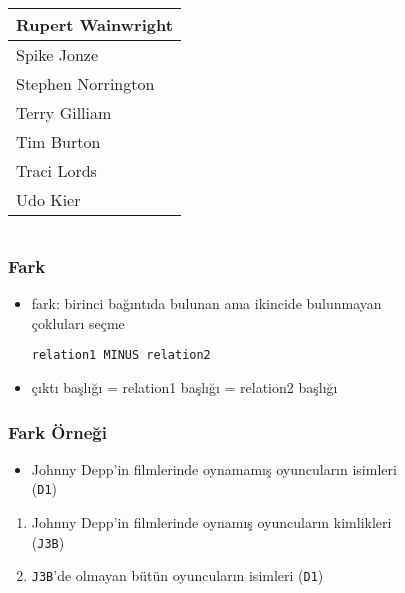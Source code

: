 \documentclass[dvipsnames]{beamer}
\theoremstyle{plain}
\begin{document}
\begin{frame}[fragile]
\begin{columns}[b]
    \begin{tiny}
    \begin{table}
      \begin{tabular}{|l|}\hline
Rupert Wainwright    \\\hline
Spike Jonze          \\\hline
Stephen Norrington   \\\hline
Terry Gilliam        \\\hline
Tim Burton           \\\hline
Traci Lords          \\\hline
Udo Kier             \\\hline
      \end{tabular}
    \end{table}
    \end{tiny}
  \end{columns}
\end{frame}

\begin{frame}[fragile]
  \frametitle{Fark}

  \begin{itemize}
    \item \alert{fark}: birinci bağıntıda bulunan ama ikincide bulunmayan\\
      çokluları seçme

    \begin{lstlisting}
relation1 MINUS relation2
    \end{lstlisting}

  \medskip
  
    \item çıktı başlığı = relation1 başlığı = relation2 başlığı
  \end{itemize}
\end{frame}

\begin{frame}
  \frametitle{Fark Örneği}

    \begin{itemize}
      \item Johnny Depp'in filmlerinde oynamamış oyuncuların isimleri\\
        (\texttt{D1})
    \end{itemize}

    \pause
    \begin{enumerate}
      \item Johnny Depp'in filmlerinde oynamış oyuncuların kimlikleri\\
        (\texttt{J3B})
      \item \texttt{J3B}'de olmayan bütün oyuncuların isimleri (\texttt{D1})
    \end{enumerate}
\end{frame}
\end{document}

